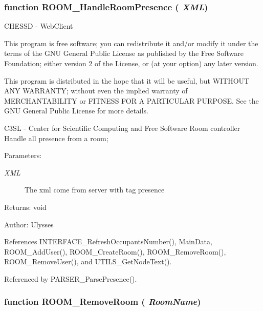 \subsubsection{\setlength{\rightskip}{0pt plus 5cm}function ROOM\_\-HandleRoomPresence ( {\em XML})}\label{room_2room_8js_52799481e66372e148ff1ee3bac60618}


CHESSD - WebClient

This program is free software; you can redistribute it and/or modify it under the terms of the GNU General Public License as published by the Free Software Foundation; either version 2 of the License, or (at your option) any later version.

This program is distributed in the hope that it will be useful, but WITHOUT ANY WARRANTY; without even the implied warranty of MERCHANTABILITY or FITNESS FOR A PARTICULAR PURPOSE. See the GNU General Public License for more details.

C3SL - Center for Scientific Computing and Free Software Room controller Handle all presence from a room;

\begin{Desc}
\item[Parameters:]
\begin{description}
\item[{\em XML}]The xml come from server with tag presence \end{description}
\end{Desc}
\begin{Desc}
\item[Returns:]void \end{Desc}
\begin{Desc}
\item[Author:]Ulysses \end{Desc}


References INTERFACE\_\-RefreshOccupantsNumber(), MainData, ROOM\_\-AddUser(), ROOM\_\-CreateRoom(), ROOM\_\-RemoveRoom(), ROOM\_\-RemoveUser(), and UTILS\_\-GetNodeText().

Referenced by PARSER\_\-ParsePresence().
\subsubsection{\setlength{\rightskip}{0pt plus 5cm}function ROOM\_\-RemoveRoom ( {\em RoomName})}\label{room_2room_8js_c30944b06d7d613f1f1d9a06f9004271}




